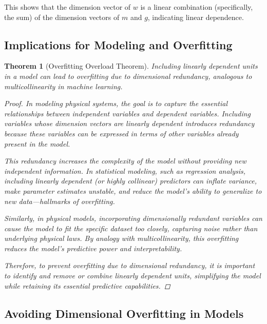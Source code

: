 \documentclass{article}
\newtheorem{theorem}{Theorem}[section]
\theoremstyle{definition}
\theoremstyle{remark}
\begin{document}
	This shows that the dimension vector of $w$ is a linear combination (specifically, the sum) of the dimension vectors of $m$ and $g$, indicating linear dependence.
	
	\subsection{Implications for Modeling and Overfitting}
	
	\begin{theorem}[Overfitting Overload Theorem]
		Including linearly dependent units in a model can lead to overfitting due to dimensional redundancy, analogous to multicollinearity in machine learning.
		
		\begin{proof}
			In modeling physical systems, the goal is to capture the essential relationships between independent variables and dependent variables. Including variables whose dimension vectors are linearly dependent introduces redundancy because these variables can be expressed in terms of other variables already present in the model.
			
			This redundancy increases the complexity of the model without providing new independent information. In statistical modeling, such as regression analysis, including linearly dependent (or highly collinear) predictors can inflate variance, make parameter estimates unstable, and reduce the model's ability to generalize to new data—hallmarks of overfitting.
			
			Similarly, in physical models, incorporating dimensionally redundant variables can cause the model to fit the specific dataset too closely, capturing noise rather than underlying physical laws. By analogy with multicollinearity, this overfitting reduces the model's predictive power and interpretability.
			
			Therefore, to prevent overfitting due to dimensional redundancy, it is important to identify and remove or combine linearly dependent units, simplifying the model while retaining its essential predictive capabilities.
		\end{proof}
	\end{theorem}
	
	\subsection{Avoiding Dimensional Overfitting in Models}
	
\end{document}
